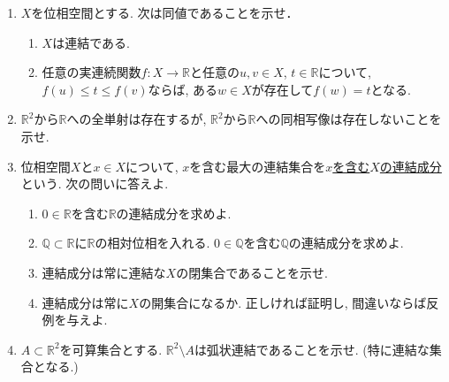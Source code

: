 \documentclass[dvipdfmx,a4paper,11pt]{article}
\newcommand{\R}{\mathbb{R}}
\newcommand{\Q}{\mathbb{Q}}
\theoremstyle{definition}
\begin{document}
\begin{enumerate}[label=\textbf{問}9.\arabic*]
\item $X$を位相空間とする. 次は同値であることを示せ．
\begin{enumerate}[label=(\roman*)]
\setlength{\parskip}{0cm}
  \setlength{\itemsep}{2pt}
  \item $X$は連結である.
  \item 任意の実連続関数$f : X \rightarrow \R$と任意の$u,v \in X$, $t \in \R$について, $f(u) \le t \le f(v)$ならば, ある$w \in X$が存在して$f(w) = t$となる. 
\end{enumerate}
\item $\R^2$から$\R$への全単射は存在するが, $\R^2$から$\R$への同相写像は存在しないことを示せ.


\item 位相空間$X$と$x \in X$について, $x$を含む最大の連結集合を\underline{$x$を含む$X$の連結成分}という. 次の問いに答えよ. 
\begin{enumerate}
\setlength{\parskip}{0cm}
  \setlength{\itemsep}{2pt}
  \item $0 \in \R$を含む$\R$の連結成分を求めよ.
  \item $\Q \subset \R$に$\R$の相対位相を入れる. $0 \in \Q$を含む$\Q$の連結成分を求めよ. 
  \item 連結成分は常に連結な$X$の閉集合であることを示せ.
  \item 連結成分は常に$X$の開集合になるか. 正しければ証明し, 間違いならば反例を与えよ.
\end{enumerate}


\item $A \subset \R^2$を可算集合とする. $\R^2 \setminus A$は弧状連結であることを示せ. (特に連結な集合となる.)


\end{enumerate}
\end{document}

